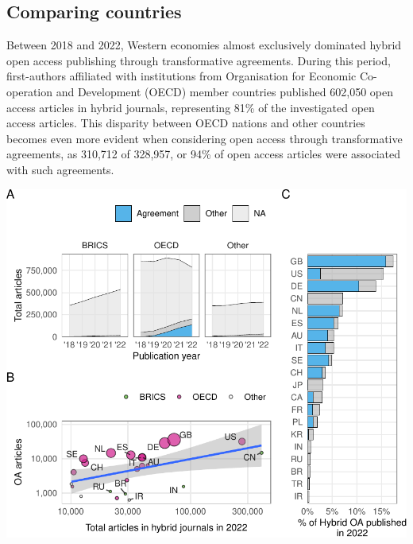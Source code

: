 \documentclass[a4paper,man,floatsintext,longtable,noextraspace,12pt]{apa6}
\begin{document}
\hypertarget{comparing-countries}{%
\subsection{Comparing countries}\label{comparing-countries}}

Between 2018 and 2022, Western economies almost exclusively dominated
hybrid open access publishing through transformative agreements. During
this period, first-authors affiliated with institutions from
Organisation for Economic Co-operation and Development (OECD) member
countries published 602,050 open access articles in hybrid journals,
representing 81\% of the investigated open access articles. This
disparity between OECD nations and other countries becomes even more
evident when considering open access through transformative agreements,
as 310,712 of 328,957, or 94\% of open access articles were associated
with such agreements.

\begin{center}\includegraphics[width=0.99\linewidth]{fig/country_patch-1} \end{center}
\end{document}
